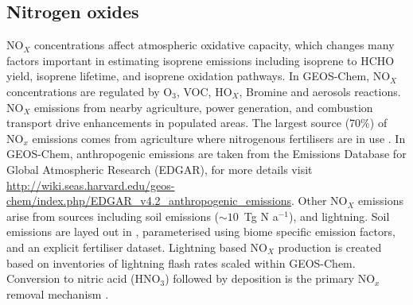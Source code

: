   \subsection{Nitrogen oxides}
  \label{Model:GC:NOx}
    NO$_X$ concentrations affect atmospheric oxidative capacity, which changes many factors important in estimating isoprene emissions including isoprene to HCHO yield, isoprene lifetime, and isoprene oxidation pathways.
    In GEOS-Chem, NO$_X$ concentrations are regulated by O$_3$, VOC, HO$_X$, Bromine and aerosols reactions.
    NO$_X$ emissions from nearby agriculture, power generation, and combustion transport drive enhancements in populated areas.
    The largest source (70\%) of NO$_x$ emissions comes from agriculture where nitrogenous fertilisers are in use \parencite{WorldBankNitrogenEmissionsPage}. %
    In GEOS-Chem, anthropogenic emissions are taken from the Emissions Database for Global Atmospheric Research (EDGAR), for more details visit \url{http://wiki.seas.harvard.edu/geos-chem/index.php/EDGAR_v4.2_anthropogenic_emissions}.
    Other NO$_X$ emissions arise from sources including soil emissions ($\sim 10$~Tg N a$^{-1}$), and lightning.
    Soil emissions are layed out in \textcite{Hudson2012}, parameterised using biome specific emission factors, and an explicit fertiliser dataset.
    Lightning based NO$_X$ production is created based on inventories of lightning flash rates scaled within GEOS-Chem.
    Conversion to nitric acid (HNO$_3$) followed by deposition is the primary NO$_x$ removal mechanism \parencite{Delmas1997, Ayers2006}.
    
